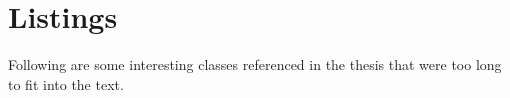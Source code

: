 \section*{Listings}

Following are some interesting classes referenced in the thesis that were too long to fit into the text.

\pagebreak

~